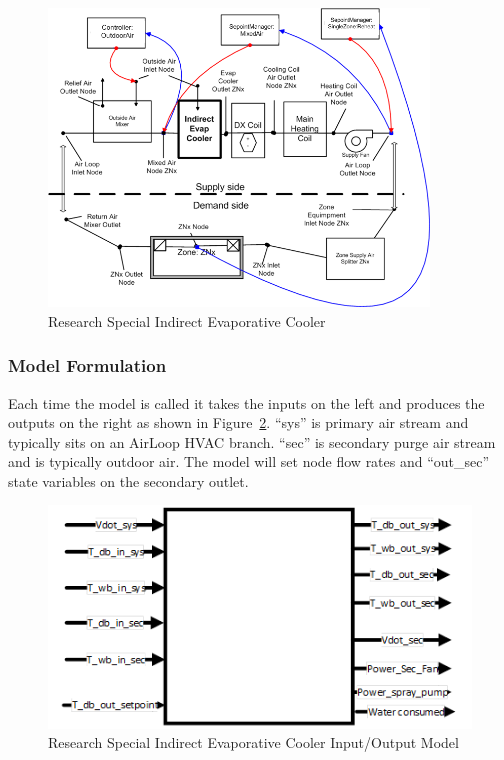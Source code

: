 \begin{figure}[hbtp] %
\centering
\includegraphics[width=0.9\textwidth, height=0.9\textheight, keepaspectratio=true]{media/image4808.png}
\caption{Research Special Indirect Evaporative Cooler \protect \label{fig:research-special-indirect-evaporative-cooler}}
\end{figure}

\subsubsection{Model Formulation}\label{model-formulation}

Each time the model is called it takes the inputs on the left and produces the outputs on the right as shown in Figure~\ref{fig:research-special-indirect-evaporative-cooler-input-output-model}. ``sys'' is primary air stream and typically sits on an AirLoop HVAC branch. ``sec'' is secondary purge air stream and is typically outdoor air. The model will set node flow rates and ``out\_sec'' state variables on the secondary outlet.

\begin{figure}[htbp]
\centering
\includegraphics{media/image8005.png}
\caption{Research Special Indirect Evaporative Cooler Input/Output Model \protect \label{fig:research-special-indirect-evaporative-cooler-input-output-model}}
\end{figure}

